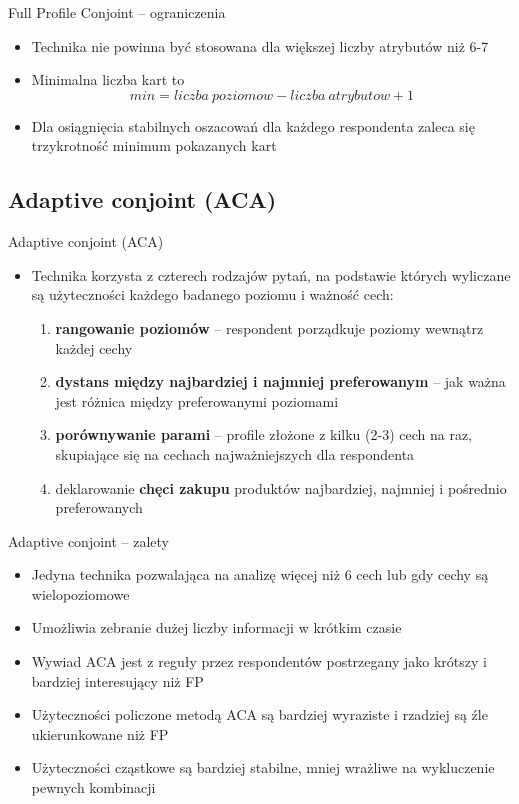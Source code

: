 \documentclass{beamer}
\begin{document}
\begin{frame}{Full Profile Conjoint -- ograniczenia}
  \begin{itemize}
  \item Technika nie powinna być stosowana dla większej liczby atrybutów niż 6-7
  \item Minimalna liczba kart to
    $$ min = liczba\ poziomow - liczba\ atrybutow + 1$$
  \item Dla osiągnięcia stabilnych oszacowań dla każdego respondenta zaleca się trzykrotność minimum pokazanych kart
  \end{itemize}
\end{frame}

\subsection{Adaptive conjoint (ACA)}
\begin{frame}{Adaptive conjoint (ACA)}
  \begin{itemize}
  \item Technika korzysta z czterech rodzajów pytań, na podstawie których wyliczane są użyteczności każdego badanego poziomu i ważność cech:
    \begin{enumerate}
    \item \textbf{rangowanie poziomów} -- respondent porządkuje poziomy wewnątrz każdej cechy
    \item \textbf{dystans między najbardziej i najmniej preferowanym} -- jak ważna jest różnica między preferowanymi poziomami
    \item \textbf{porównywanie parami} -- profile złożone z kilku (2-3) cech na raz, skupiające się na cechach najważniejszych dla respondenta
    \item deklarowanie \textbf{chęci zakupu} produktów najbardziej, najmniej i pośrednio preferowanych
    \end{enumerate}
  \end{itemize}
\end{frame}

\begin{frame}{Adaptive conjoint -- zalety}
  \begin{itemize}
  \item Jedyna technika pozwalająca na analizę więcej niż 6 cech lub gdy cechy są wielopoziomowe
  \item Umożliwia zebranie dużej liczby informacji w krótkim czasie
  \item Wywiad ACA jest z reguły przez respondentów postrzegany jako krótszy i bardziej interesujący niż FP
  \item Użyteczności policzone metodą ACA są bardziej wyraziste i rzadziej są źle ukierunkowane niż FP
  \item Użyteczności cząstkowe są bardziej stabilne, mniej wrażliwe na wykluczenie pewnych kombinacji
  \end{itemize}
\end{frame}
\end{document}
